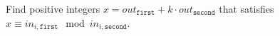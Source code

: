 Find positive integers $x=out_{\mathtt{first}}+k\cdot out_{\mathtt{second}}$ that satisfies $x\equiv in_{i,\mathtt{first}}\mod in_{i,\mathtt{second}}$.

\inputminted{cpp}{src/mathematics/equality-and-inequality/chinese-remainder-theorem.cpp.com}

